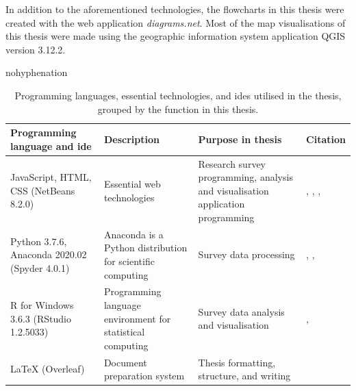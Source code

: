 In addition to the aforementioned technologies, the flowcharts in this thesis were created with the web application \textit{diagrams.net}. Most of the map visualisations of this thesis were made using the geographic information system application QGIS version 3.12.2.

\begin{hyphenrules}{nohyphenation}
    \begin{table}[H]
        \centering
        \caption[Thesis programming languages]{Programming languages, essential technologies, and \glspl{ide} utilised in the thesis, grouped by the function in this thesis.} 
        \label{tab:used_langs}
        \def\arraystretch{1.4}
        \setlength\tabcolsep{1.2ex}
        \begin{tabular}{ @{} >{\raggedright\arraybackslash}p{3cm} >{\raggedright\arraybackslash}p{4.5cm} >{\raggedright\arraybackslash}p{3.5cm} >{\raggedleft\arraybackslash}p{3.5cm} @{} }
            \toprule
            Programming language and \gls{ide} & Description & Purpose in thesis & Citation \\
            \midrule
            JavaScript, HTML, CSS (NetBeans 8.2.0) & Essential web technologies & Research survey programming, analysis and visualisation application programming & \cite{WHATWG2020}, \cite{W3C2020}, \cite{ECMA2019}, \cite{ApacheSoftwareFoundation2016} \\
            Python 3.7.6, Anaconda 2020.02 (Spyder 4.0.1) & Anaconda is a Python distribution for scientific computing & Survey data processing & \cite{Python3Reference}, \cite{AnacondaInc.2020}, \cite{SpyderProjectContributors2020} \\
            R for Windows 3.6.3 (RStudio 1.2.5033) & Programming language environment for statistical computing & Survey data analysis and visualisation & \cite{RCoreTeam2020}, \cite{RStudioTeam2015} \\
            LaTeX (Overleaf) & Document preparation system & Thesis formatting, structure, and writing & \cite{Overleaf2020} \\
            \bottomrule
        \end{tabular}
    \end{table} 
\end{hyphenrules}

